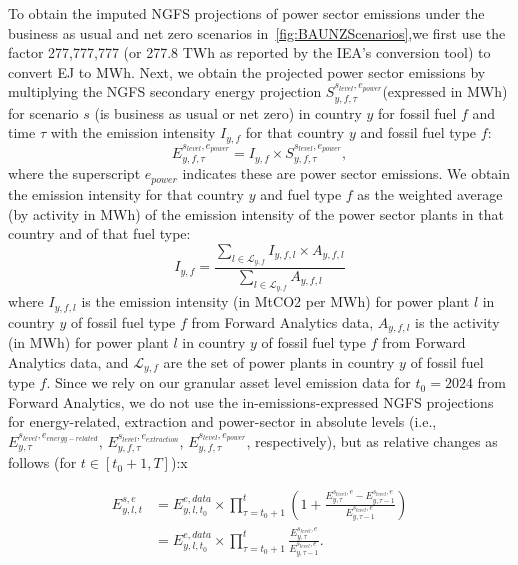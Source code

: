 \documentclass[11pt,a4paper,table,xcdraw]{article}
\begin{document}
To obtain the imputed NGFS projections of power sector emissions under the business as usual and net zero scenarios in~\ref{fig:BAUNZScenarios},we first use the factor 277,777,777 (or 277.8 TWh as reported by the IEA's conversion tool\footnotemark[3]) to convert EJ to MWh. Next, we obtain the projected power sector emissions by multiplying the NGFS secondary energy projection $S^{s_{level},e_{power}}_{y,f,\tau}$(expressed in MWh) for scenario $s$ (is business as usual or net zero) in country $y$ for fossil fuel $f$ and time $\tau$ with the emission intensity $I_{y,f}$ for that country $y$ and fossil fuel type $f$:
\begin{equation}
E^{s_{level},e_{power}}_{y,f,\tau} = I_{y,f} \times S^{s_{level},e_{power}}_{y,f,\tau}
\label{eq:PowerSectorEmissions}, \end{equation}
where the superscript $e_{power}$ indicates these are power sector emissions. We obtain the emission intensity for that country $y$ and fuel type $f$ as the weighted average (by activity in MWh) of the emission intensity of the power sector plants in that country and of that fuel type:
 \begin{equation}
            I_{y,f} =  \frac{\sum_{l \in \mathcal{L}_{y,f}} I_{y,f,l} \times A_{y,f,l}}{\sum_{l \in \mathcal{L}_{y,f}} A_{y,f,l}}
        \end{equation}
where  $I_{y,f,l}$ is the emission intensity (in MtCO2 per MWh) for power plant $l$ in country $y$ of fossil fuel type $f$ from Forward Analytics data, $A_{y,f,l}$ is the activity (in MWh) for power plant $l$ in country $y$ of fossil fuel type $f$ from Forward Analytics data, and $\mathcal{L}_{y,f}$ are the set of power plants in country $y$ of fossil fuel type $f$.\newline
\indent Since we rely on our granular asset level emission data for $t_0=2024$ from Forward Analytics, we do not use the in-emissions-expressed NGFS projections for energy-related, extraction and power-sector in absolute levels (i.e., $E^{s_{level},e_{energy-related}}_{y,\tau}$, $E^{s_{level},e_{extraction}}_{y,f,\tau}$, $E^{s_{level},e_{power}}_{y,f,\tau}$, respectively), but as relative changes as follows (for $t\in[t_0+1,T]$):x

\begin{align} \label{eq:EmissionProjections}
E^{s,e}_{y,l,t}&=
E^{e,data}_{y,l,t_0} \times \prod^{t}_{\tau=t_0+1} (1 + \frac{E^{s_{level}, e}_{y,\tau}-E^{s_{level}, e}_{y,\tau-1}}{E^{s_{level}, e}_{y,\tau-1}}) \\ \nonumber
&=E^{e,data}_{y,l,t_0} \times \prod^{t}_{\tau=t_0+1} \frac{E^{s_{level}, e}_{y,\tau}}{E^{s_{level}, e}_{y,\tau-1}}.
\end{align}
\end{document}
